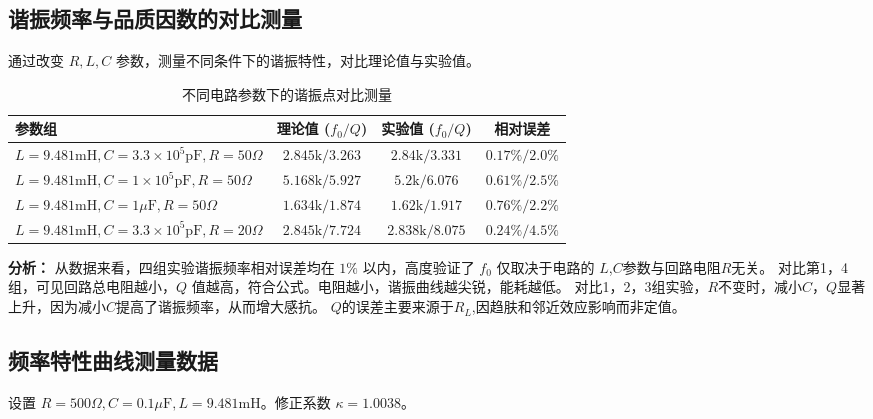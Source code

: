 \documentclass[11pt, a4paper]{article}
\begin{document}
	\subsection{谐振频率与品质因数的对比测量}
	通过改变 $R, L, C$ 参数，测量不同条件下的谐振特性，对比理论值与实验值。
	
	\begin{table}[H]
		\centering
		\caption{不同电路参数下的谐振点对比测量}
		\begin{tabular}{l c c c}
			\toprule
			参数组 & 理论值 ($f_0 / Q$) & 实验值 ($f_0 / Q$) & 相对误差 \\
			\midrule
			$L=9.481\text{mH}, C=3.3 \times 10^5\text{pF}, R=50\Omega$ & $2.845\text{k} / 3.263$ & $2.84\text{k} / 3.331$ & $0.17\% / 2.0\%$ \\
			$L=9.481\text{mH}, C=1 \times 10^5\text{pF}, R=50\Omega$ & $5.168\text{k} / 5.927$ & $5.2\text{k} / 6.076$ & $0.61\% / 2.5\%$ \\
			$L=9.481\text{mH}, C=1\mu\text{F}, R=50\Omega$ & $1.634\text{k} / 1.874$ & $1.62\text{k} / 1.917$ & $0.76\% / 2.2\%$ \\
			$L=9.481\text{mH}, C=3.3 \times 10^5\text{pF}, R=20\Omega$ & $2.845\text{k} / 7.724$ & $2.838\text{k} / 8.075$ & $0.24\% / 4.5\%$ \\
			\bottomrule
		\end{tabular}
	\end{table}
		\noindent \textbf{分析：} 从数据来看，四组实验谐振频率相对误差均在 $1\%$ 以内，高度验证了 $f_0$ 仅取决于电路的 $L$,$C$参数与回路电阻$R$无关。
		对比第1，4组，可见回路总电阻越小，$Q$ 值越高，符合公式。电阻越小，谐振曲线越尖锐，能耗越低。
		对比1，2，3组实验，$R$不变时，减小$C$，$Q$显著上升，因为减小$C$提高了谐振频率，从而增大感抗。
		$Q$的误差主要来源于$R_L$,因趋肤和邻近效应影响而非定值。
	
	\subsection{频率特性曲线测量数据}
	设置 $R=500\Omega, C=0.1\mu\text{F}, L=9.481\text{mH}$。修正系数 $\kappa = 1.0038$。
	
\end{document}
